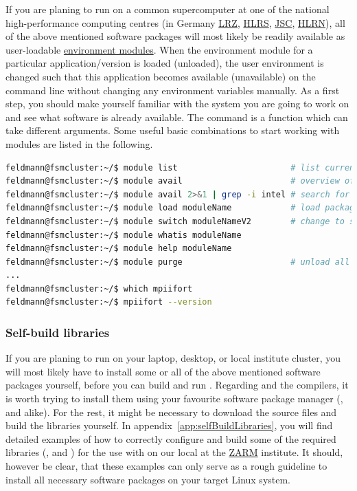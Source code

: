 \documentclass[a4paper, 11pt, DIV=11]{scrartcl}
\begin{document}
If you are planing to run \nsc on a common supercomputer at one of the national
high-performance computing centres (\eg in Germany
\href{https://www.lrz.de/english/}{LRZ}, 
\href{https://www.hlrs.de/home/}{HLRS}, 
\href{http://www.fz-juelich.de/ias/jsc/EN/Home/home_node.html}{JSC}, 
\href{https://www.hlrn.de/home/}{HLRN}),
all of the above mentioned software packages will most likely be readily available
as user-loadable \href{http://modules.sourceforge.net/}{environment modules}.
When the environment module for a particular application/version is loaded
(unloaded), the user environment is changed such that this application becomes
available (unavailable) on the command line without changing any environment
variables manually. As a first step, you should make yourself familiar with the
system you are going to work on and see what software is already available. The
 command is a function which can take different arguments. Some useful basic
combinations to start working with modules are listed in the following.
\begin{lstlisting}[language=bash]
feldmann@fsmcluster:~/$ module list                       # list currently loaded packages
feldmann@fsmcluster:~/$ module avail                      # overview of available packages
feldmann@fsmcluster:~/$ module avail 2>&1 | grep -i intel # search for specific things
feldmann@fsmcluster:~/$ module load moduleName            # load package, default version
feldmann@fsmcluster:~/$ module switch moduleNameV2        # change to specific version 
feldmann@fsmcluster:~/$ module whatis moduleName
feldmann@fsmcluster:~/$ module help moduleName
feldmann@fsmcluster:~/$ module purge                      # unload all packages
...
feldmann@fsmcluster:~/$ which mpiifort
feldmann@fsmcluster:~/$ mpiifort --version
\end{lstlisting}

\subsubsection{Self-build libraries}
\label{sec:selfBuildLibraries}

If you are planing to run \nsc on your laptop, desktop, or local
institute cluster, you will most likely have to install some or all of the above
mentioned software packages yourself, before you can build and run \nsc. 
Regarding \mpi and the compilers, it is worth trying to install them using your 
favourite software package manager (,  and alike). For
the rest, it might be necessary to download the source files and 
build the libraries yourself. In appendix~\ref{app:selfBuildLibraries}, you will find detailed
examples of how to correctly configure and build some of the required libraries (,  and \hdf) for the use with \nsc on our local  at the  
\href{https://www.zarm.uni-bremen.de/en/}{ZARM} institute. 
It should, however be clear, that these examples can only serve as a rough guideline to install all necessary software
packages on your target Linux system.
\end{document}
